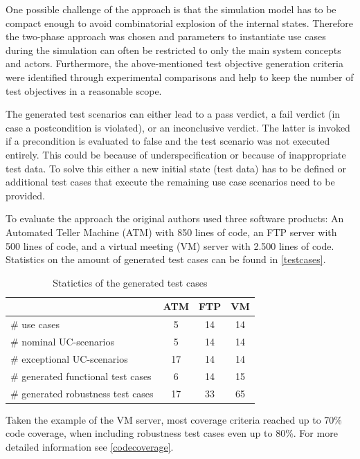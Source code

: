 One possible challenge of the approach is that the simulation model has to be compact enough to avoid combinatorial explosion of the internal states. Therefore the two-phase approach was chosen and parameters to instantiate use cases during the simulation can often be restricted to only the main system concepts and actors. Furthermore, the above-mentioned test objective generation criteria were identified through experimental comparisons and help to keep the number of test objectives in a reasonable scope. 

The generated test scenarios can either lead to a pass verdict, a fail verdict (in case a postcondition is violated), or an inconclusive verdict. The latter is invoked if a precondition is evaluated to false and the test scenario was not executed entirely. This could be because of underspecification or because of inappropriate test data. To solve this either a new initial state (test data) has to be defined or additional test cases that execute the remaining use case scenarios need to be provided. 

To evaluate the approach the original authors used three software products: An Automated Teller Machine (ATM) with 850 lines of code, an FTP server with 500 lines of code, and a virtual meeting (VM) server with 2.500 lines of code. Statistics on the amount of generated test cases can be found in \autoref{testcases}.

\begin{table}[h] 
	\centering
	\begin{small}
		\caption{Statictics of the generated test cases}
		\label{testcases}
		\setlength{\tabcolsep}{1em}
		\begin{tabular}{l|c|c|c}
			\hline
			& \textbf{ATM} & \textbf{FTP} & \textbf{VM} \\
			\hline
			\hline	
			\# use cases & 5 & 14 & 14 \\
			\hline
			\# nominal UC-scenarios & 5 & 14 & 14 \\
			\hline
			\# exceptional UC-scenarios & 17 & 14 & 14 \\
			\hline
			\# generated functional test cases & 6 & 14 & 15 \\
			\hline
			\# generated robustness test cases & 17 & 33 & 65 \\
			\hline
		\end{tabular}
	\end{small}
\end{table}

Taken the example of the VM server, most coverage criteria reached up to 70\% code coverage, when including robustness test cases even up to 80\%. For more detailed information see \autoref{codecoverage}.

